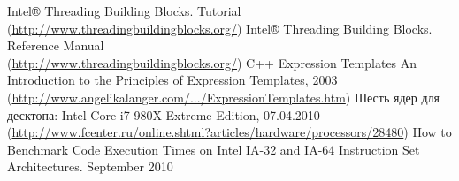 \documentclass[12pt, a4paper]{article}
\begin{document}
\begin{thebibliography}{99}
	 Intel® Threading Building Blocks. Tutorial \\ (\href{http://www.threadingbuildingblocks.org/}{http://www.threadingbuildingblocks.org/})
	 Intel® Threading Building Blocks. Reference Manual \\ (\href{http://www.threadingbuildingblocks.org/}{http://www.threadingbuildingblocks.org/})
	 C++ Expression Templates An Introduction to the Principles of Expression Templates, 2003 \\ (\href{http://www.angelikalanger.com/Articles/Cuj/ExpressionTemplates/ExpressionTemplates.htm}{http://www.angelikalanger.com/.../ExpressionTemplates.htm})
	 Шесть ядер для десктопа: Intel Core i7-980X Extreme Edition, 07.04.2010 \\ (\href{http://www.fcenter.ru/online.shtml?articles/hardware/processors/28480}{http://www.fcenter.ru/online.shtml?articles/hardware/processors/28480})
	 How to Benchmark Code Execution Times on Intel IA-32 and IA-64 Instruction Set Architectures. September 2010
\end{thebibliography}

\newpage

\end{document}
